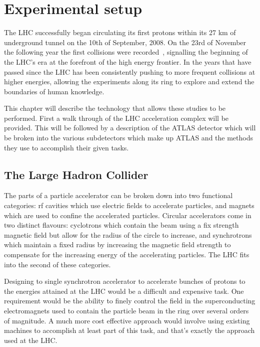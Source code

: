 \chapter{Experimental setup}
\label{Experiment}
The \gls{LHC} successfully began circulating its first protons within its 27 km of underground tunnel on the 10th of September, 2008.  
On the 23rd of November the following year the first collisions were recorded~\cite{FirstCollisions}, signalling the beginning of the LHC's era at the forefront of the high energy frontier.  
In the years that have passed since the LHC has been consistently pushing to more frequent collisions at higher energies, allowing the experiments along its ring to explore and extend the boundaries of human knowledge.  

This chapter will describe the technology that allows these studies to be performed.  
First a walk through of the LHC acceleration complex will be provided.  
This will be followed by a description of the ATLAS detector which will be broken into the various subdetectors which make up ATLAS and the methods they use to accomplish their given tasks.   

\section{The Large Hadron Collider}
\label{Sec:LHC}

The parts of a particle accelerator can be broken down into two functional categories: rf cavities which use electric fields to accelerate particles, and magnets which are used to confine the accelerated particles.  
Circular accelerators come in two distinct flavours: cyclotrons which contain the beam using a fix strength magnetic field but allow for the radius of the circle to increase, and synchrotrons which maintain a fixed radius by increasing the magnetic field strength to compensate for the increasing energy of the accelerating particles.  
The LHC fits into the second of these categories.  

Designing to single synchrotron accelerator to accelerate bunches of protons to the energies attained at the LHC would be a difficult and expensive task.
One requirement would be the ability to finely control the field in the superconducting electromagnets used to contain the particle beam in the ring over several orders of magnitude.  
A much more cost effective approach would involve using existing machines to accomplish at least part of this task, and that's exactly the approach used at the LHC.  

